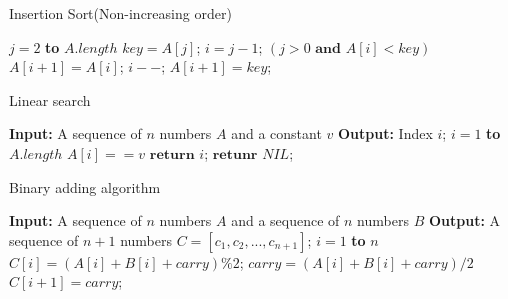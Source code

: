 \documentclass[review, authoryear, 3p, 12pt]{elsarticle}
\begin{document}
	\begin{algorithm}[htbp]
		\caption{Insertion Sort(Non-increasing order)}
		\label{alg:tsh}
		\begin{codebox}
			\li 	\For $j=2$ \textbf{to} $A.length$
					\Do
			\li 		$key = A[j]$;
			\li 		$i = j-1$;
			\li 		\While $(j>0 \textbf{ and } A[i] < key)$
						\Do
			\li				$A[i+1]=A[i]$;
			\li 			$i--$; 
						\End
			\li		$A[i+1]=key$;
		\end{codebox}
	\end{algorithm}
	
	\begin{algorithm}[htbp]
		\caption{Linear search}
		\label{alg:tsh}
		\begin{codebox}
			\zi		\textbf{Input:} A sequence of $n$ numbers $A$ and a constant $v$
			\zi 	\textbf{Output:} Index $i$;
			\li 	\For $i=1$ \textbf{to} $A.length$
			\Do
			\li 		\If $A[i] == v$ 
			\Then
			\li				$\textbf{return } i$;
			\End
			\End
			\li		$\textbf{retunr } NIL$;
		\end{codebox}
	\end{algorithm}
	
	\begin{algorithm}[htbp]
		\caption{Binary adding algorithm}
		\label{alg:tsh}
		\begin{codebox}
			\zi		\textbf{Input:} A sequence of $n$ numbers $A$ and a sequence of $n$ numbers $B$
			\zi 	\textbf{Output:} A sequence of $n+1$ numbers $C = [c_1, c_2, . . . , c_{n+1}]$;
			\li 	\For $i=1$ \textbf{to} $n$
			\Do
			\li 		$C[i]=(A[i]+B[i]+carry)\%2$;
			\li 		$carry=(A[i]+B[i]+carry)/2$
			\End
			\li		$C[i+1]=carry$;
		\end{codebox}
	\end{algorithm}
\end{document}
